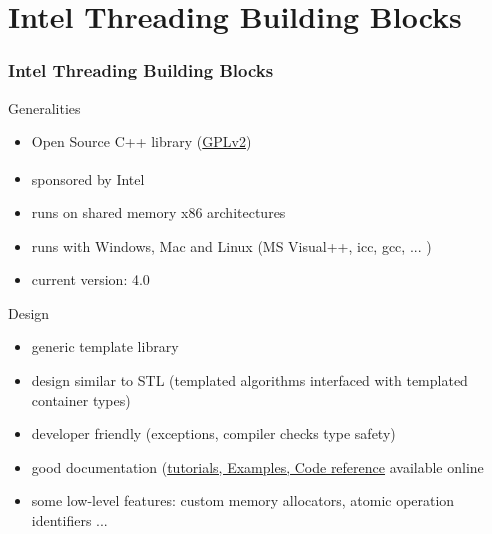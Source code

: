 \documentclass[9pt,pdftex]{beamer}
\begin{document}
\section[TBB]{Intel Threading Building Blocks}
\begin{frame}
  \frametitle{Intel Threading Building Blocks}
  \begin{block}{Generalities}
    \begin{itemize}
    \item Open Source C++ library (\href{http://gcc.gnu.org/onlinedocs/libstdc++/manual/bk01pt01ch01s02.html}{GPLv2})
    \item sponsored by Intel\textsuperscript{\texttrademark}
    \item runs on shared memory x86 architectures
    \item runs with Windows, Mac and Linux (MS Visual++, icc, gcc, ... )
    \item current version: 4.0 
    \end{itemize}
  \end{block}

  \begin{block}{Design}
    \begin{itemize}
    \item generic template library
    \item design similar to STL (templated algorithms interfaced with templated container types)
    \item developer friendly (exceptions, compiler checks type safety)
    \item good documentation (\href{http://threadingbuildingblocks.org/documentation.php}{tutorials, Examples, Code reference} available online
    \item some low-level features: custom memory allocators, atomic operation identifiers ...
    \end{itemize}
  \end{block}
\end{frame}


\end{document}
